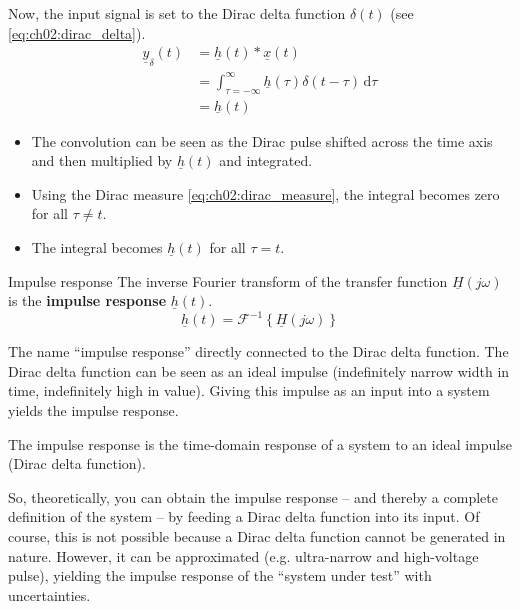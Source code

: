 \begin{refsection}
Now, the input signal is set to the Dirac delta function $\delta(t)$ (see \eqref{eq:ch02:dirac_delta}).
\begin{equation}
	\begin{split}
		\underline{y}_\delta(t) &= \underline{h}(t) * \underline{x}(t) \\
		 &= \int_{\tau = -\infty}^{\infty} \underline{h}(\tau) \delta(t - \tau) \, \mathrm{d} \tau \\
		 &= \underline{h}(t)
	\end{split}
\end{equation}

\begin{itemize}
	\item The convolution can be seen as the Dirac pulse shifted across the time axis and then multiplied by $\underline{h}(t)$ and integrated.
	\item Using the Dirac measure \eqref{eq:ch02:dirac_measure}, the integral becomes zero for all $\tau \neq t$.
	\item The integral becomes $\underline{h}(t)$ for all $\tau = t$.
\end{itemize}

\begin{definition}{Impulse response}
	The inverse Fourier transform of the transfer function $\underline{H} \left(j \omega\right)$ is the  \textbf{impulse response} $\underline{h}(t)$.
	\begin{equation}
		\underline{h}(t) = \mathcal{F}^{-1}\left\{\underline{H} \left(j \omega\right)\right\}
	\end{equation}%
\end{definition}

The name ``impulse response'' directly connected to the Dirac delta function. The Dirac delta function can be seen as an ideal impulse (indefinitely narrow width in time, indefinitely high in value). Giving this impulse as an input into a system yields the impulse response.

\begin{fact}
	The impulse response is the time-domain response of a system to an ideal impulse (Dirac delta function).
\end{fact}

So, theoretically, you can obtain the impulse response -- and thereby a complete definition of the system -- by feeding a Dirac delta function into its input. Of course, this is not possible because a Dirac delta function cannot be generated in nature. However, it can be approximated (e.g. ultra-narrow and high-voltage pulse), yielding the impulse response of the ``system under test'' with uncertainties.


\end{refsection}
